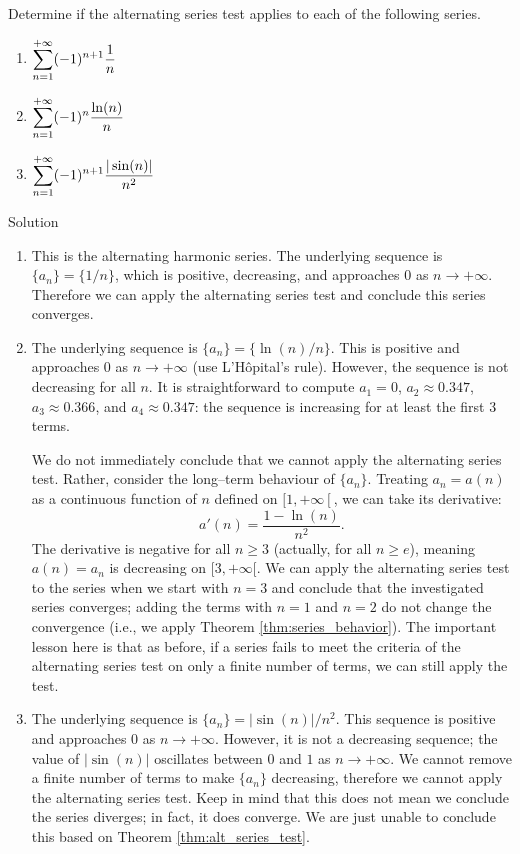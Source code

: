 \begin{example}\label{ex_alt1}
Determine if the alternating series test applies to each of the following series.
\begin{multicols}{3}
\begin{enumerate}
    \item $\displaystyle \sum_{n=1}^{+\infty} (-1)^{n+1}\frac1n$
    \item $\displaystyle\sum_{n=1}^{+\infty} (-1)^n\frac{\ln(n)}{n}$ 
    \item $\displaystyle\sum_{n=1}^{+\infty} (-1)^{n+1}\frac{|\sin(n)|}{n^2}$
\end{enumerate}
\end{multicols}


Solution 

\begin{enumerate}
	\item This is the alternating harmonic series. The underlying sequence is $\{a_n\} = \{1/n\}$, which is positive, decreasing, and approaches 0 as $n\to+\infty$. Therefore we can apply the alternating series test and conclude this series converges. 
	
	
	\item		The underlying sequence is $\{a_n\} = \{\ln(n)/n\}$. This is positive and approaches 0 as $n\to+\infty$ (use L'H\^opital's rule). However, the sequence is not decreasing for all $n$. It is straightforward to compute $a_1=0$, $a_2\approx0.347$, $a_3\approx 0.366$, and $a_4\approx 0.347$: the sequence is increasing for at least the first 3 terms. 
	
	We do not immediately conclude that we cannot apply the alternating series test. Rather, consider the long--term behaviour of $\{a_n\}$. Treating $a_n=a(n)$ as a continuous function of $n$ defined on $[1,+\infty\left[\right.$, we can take its derivative:
	$$a'(n) = \frac{1-\ln(n)}{n^2}.$$
	The derivative is negative for all $n\geq 3$ (actually, for all $n\geq e$), meaning $a(n)=a_n$ is decreasing on $[3,+\infty[$. We can apply the alternating series test to the series when we start with $n=3$ and conclude that the investigated series converges; adding the terms with $n=1$ and $n=2$ do not change the convergence (i.e., we apply Theorem \ref{thm:series_behavior}). The important lesson here is that as before, if a series fails to meet the criteria of the alternating series test on only a finite number of terms, we can still apply the test.
	
	\item  The underlying sequence is $\{a_n\} = |\sin(n)|/n^2$. This sequence is positive and approaches $0$ as $n\to+\infty$. However, it is not a decreasing sequence; the value of $|\sin(n)|$ oscillates between $0$ and $1$ as $n\to+\infty$. We cannot remove a finite number of terms to make $\{a_n\}$ decreasing, therefore we cannot apply the alternating series test. Keep in mind that this does not mean we conclude the series diverges; in fact, it does converge. We are just unable to conclude this based on Theorem \ref{thm:alt_series_test}.
\end{enumerate}
\end{example}


